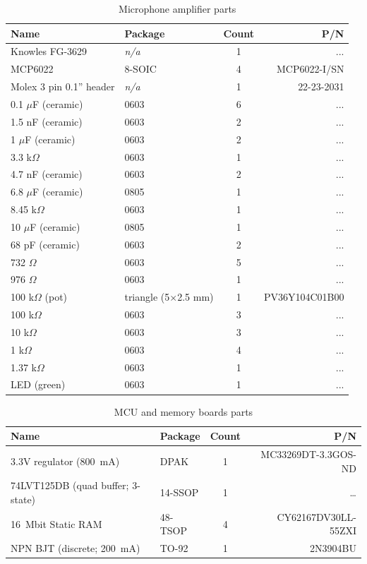 \documentclass[letterpaper]{article}
\begin{document}
\begin{table}[h]
\caption{Microphone amplifier parts}
\label{mic_parts:tbl}
\centering
\begin{tabular}{|l|l|c|r|}
\hline
\textbf{Name}&\textbf{Package}&\textbf{Count}&\textbf{P/N}\\
\hline
\hline
Knowles FG-3629 & \textit{n/a} & 1 & ...\\
\hline
MCP6022 & 8-SOIC & 4 & MCP6022-I/SN\\
\hline
Molex 3 pin 0.1'' header & \textit{n/a} & 1 & 22-23-2031\\
\hline
0.1 $\mu$F (ceramic) & 0603 & 6 & ...\\
\hline
1.5 nF (ceramic) & 0603 & 2 & ...\\
\hline
1 $\mu$F (ceramic) & 0603 & 2 & ...\\
\hline
3.3 k$\Omega$ & 0603 & 1 & ...\\
\hline
4.7 nF (ceramic) & 0603 & 2 & ...\\
\hline
6.8 $\mu$F (ceramic) & 0805 & 1 & ...\\
\hline
8.45 k$\Omega$ & 0603 & 1 & ...\\
\hline
10 $\mu$F (ceramic) & 0805 & 1 & ...\\
\hline
68 pF (ceramic) & 0603 & 2 & ...\\
\hline
732 $\Omega$ & 0603 & 5 & ...\\
\hline
976 $\Omega$ & 0603 & 1 & ...\\
\hline
100 k$\Omega$ (pot) & triangle (5$\times$2.5 mm) & 1 & PV36Y104C01B00\\
\hline
100 k$\Omega$ & 0603 & 3 & ...\\
\hline
10 k$\Omega$ & 0603 & 3 & ...\\
\hline
1 k$\Omega$ & 0603 & 4 & ...\\
\hline
1.37 k$\Omega$ & 0603 & 1 & ...\\
\hline
LED (green) & 0603 & 1 & ...\\
\hline
\end{tabular}
\end{table}

\begin{table}[h]
\caption{MCU and memory boards parts}
\label{mcu_parts:tbl}
\centering
\begin{tabular}{|l|l|c|r|}
\hline
\textbf{Name}&\textbf{Package}&\textbf{Count}&\textbf{P/N}\\
\hline
\hline
3.3V regulator (800~mA) & DPAK & 1 & MC33269DT-3.3GOS-ND\\
\hline
74LVT125DB (quad buffer; 3-state) & 14-SSOP & 1 & \ldots\\
\hline
16~Mbit Static RAM & 48-TSOP & 4 & CY62167DV30LL-55ZXI\\
\hline
NPN BJT (discrete; 200~mA) & TO-92 & 1 & 2N3904BU\\
\hline
\end{tabular}
\end{table}
\end{document}
